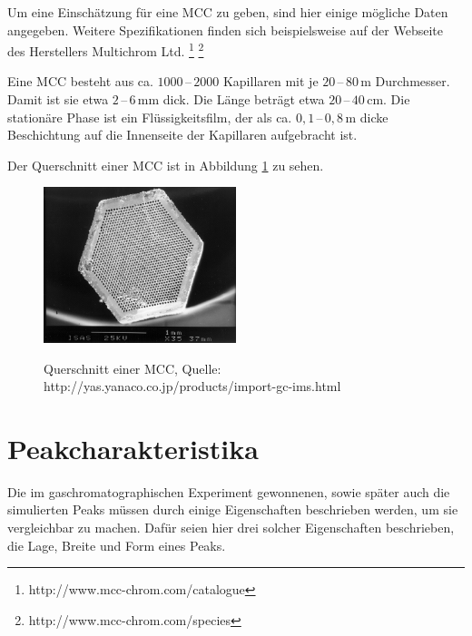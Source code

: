 Um eine Einschätzung für eine MCC zu geben, sind hier einige mögliche Daten angegeben. Weitere Spezifikationen finden sich beispielsweise auf der Webseite des Herstellers Multichrom Ltd. \footnote[1]{http://www.mcc-chrom.com/catalogue} \footnote[2]{http://www.mcc-chrom.com/species} 


Eine MCC besteht aus ca. $1000\,$--$\,2000$ Kapillaren mit je $20\,$--$\,80$\,\textmu m Durchmesser. Damit ist sie etwa $2\,$--$\,6$\,mm dick. Die Länge beträgt etwa  $20\,$--$\,40 $\,cm. Die stationäre Phase ist ein Flüssigkeitsfilm, der als ca. $0,1\,$--$\,0,8$\,\textmu m dicke Beschichtung auf die Innenseite der Kapillaren aufgebracht ist. 

Der Querschnitt einer MCC ist in Abbildung \ref{MCC} zu sehen.

\begin{figure}[h]
 \centering
  \includegraphics[width = 0.5\textwidth]{bilder/MultiCapillaryColumn}\\
  \caption[Querschnitt einer MCC]{Querschnitt einer MCC, Quelle: http://yas.yanaco.co.jp/products/import-gc-ims.html}
  \label{MCC}
\end{figure}

\section{Peakcharakteristika}
Die im gaschromatographischen Experiment gewonnenen, sowie später auch die simulierten Peaks müssen durch einige Eigenschaften beschrieben werden, um sie vergleichbar zu machen. Dafür seien hier drei solcher Eigenschaften beschrieben, die Lage, Breite und Form eines Peaks.


